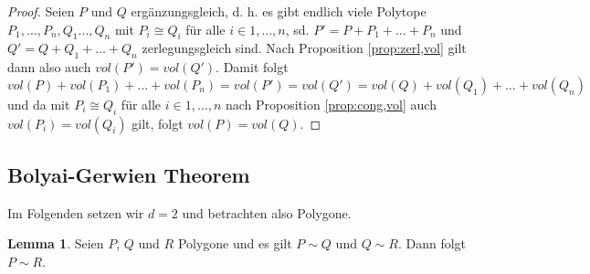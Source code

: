 \documentclass[11pt,titlepage]{article}
\theoremstyle{definition}
\newtheorem{lemma}[theorem]{Lemma}
\theoremstyle{remark}
\begin{document}
	\begin{proof}
		Seien $P$ und $Q$ ergänzungsgleich, d. h. es gibt endlich viele Polytope $P_1,\ldots,P_n,
		Q_1\ldots,Q_n$ mit $P_i\cong Q_i$ für alle $i\in{1,\ldots,n}$, sd. 
		$P'=P+P_1+\ldots+P_n$ und $Q'=Q+Q_1+\ldots+Q_n$ zerlegungsgleich sind. Nach 
		Proposition \ref{prop:zerl,vol} gilt dann also auch $vol(P')=vol(Q')$. Damit folgt
		\[vol(P)+vol(P_1)+\ldots+vol(P_n)=vol(P')=vol(Q')=vol(Q)+vol(Q_1)+\ldots+vol(Q_n)\]
		und da mit $P_i\cong Q_i$ für alle $i\in{1,\ldots,n}$ nach Proposition \ref{prop:cong,vol} 
		auch $vol(P_i)=vol(Q_i)$ gilt, folgt $vol(P)=vol(Q)$.
	\end{proof}
	
	\subsection{Bolyai-Gerwien Theorem}
	
	Im Folgenden setzen wir $d=2$ und betrachten also Polygone.
	
	\begin{lemma} \label{lemma:transitiv}
		Seien $P$, $Q$ und $R$ Polygone und es gilt $P\sim Q$ und $Q\sim R$. Dann folgt $P\sim R$.
	\end{lemma}
	
\end{document}

